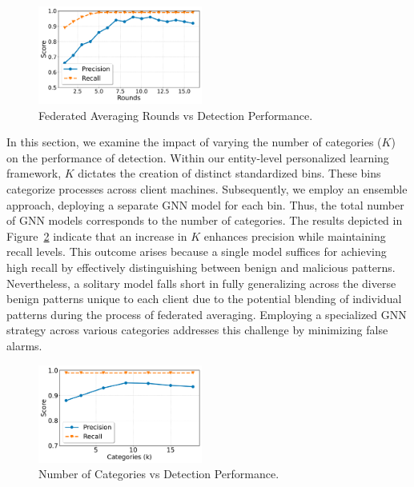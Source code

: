 \begin{figure}[t!]
  \centering
  \includegraphics[width=0.48\textwidth]{fig/roundsvsscore.pdf}
  \caption{Federated Averaging Rounds vs Detection Performance.}
  \label{roundsvsscore}
  \vspace{-2ex}
\end{figure}

 In this section, we examine the impact of varying the number of categories ($K$) on the performance of detection. Within our entity-level personalized \gnnshort learning framework, $K$ dictates the creation of distinct standardized bins. These bins categorize processes across client machines. Subsequently, we employ an ensemble approach, deploying a separate GNN model for each bin. Thus, the total number of GNN models corresponds to the number of categories. The results depicted in Figure~\ref{catgvsscore} indicate that an increase in $K$ enhances precision while maintaining recall levels. This outcome arises because a single model suffices for achieving high recall by effectively distinguishing between benign and malicious patterns. Nevertheless, a solitary model falls short in fully generalizing across the diverse benign patterns unique to each client due to the potential blending of individual patterns during the process of federated averaging. Employing a specialized GNN strategy across various categories addresses this challenge by minimizing false alarms.

\begin{figure}[t!]
  \centering
  \includegraphics[width=0.48\textwidth]{fig/kvsscore.pdf}
  \caption{Number of Categories vs Detection Performance.}
  \label{catgvsscore}
  \vspace{-2ex}
\end{figure}



